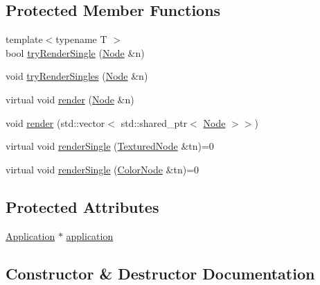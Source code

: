 \subsection*{Protected Member Functions}
\begin{DoxyCompactItemize}
\item 
{\footnotesize template$<$typename T $>$ }\\bool \mbox{\hyperlink{classsage_1_1Renderer_a2735ace3b20cd5703c54b0825ce3df85}{try\+Render\+Single}} (\mbox{\hyperlink{classsage_1_1Node}{Node}} \&n)
\item 
void \mbox{\hyperlink{classsage_1_1Renderer_a860500c3a330cee6471f384e5a8139c1}{try\+Render\+Singles}} (\mbox{\hyperlink{classsage_1_1Node}{Node}} \&n)
\item 
virtual void \mbox{\hyperlink{classsage_1_1Renderer_a213548aab22256923579dcfda01b12ba}{render}} (\mbox{\hyperlink{classsage_1_1Node}{Node}} \&n)
\item 
void \mbox{\hyperlink{classsage_1_1Renderer_a26b3671c3df207eaf2620fdc06a2610e}{render}} (std\+::vector$<$ std\+::shared\+\_\+ptr$<$ \mbox{\hyperlink{classsage_1_1Node}{Node}} $>$$>$)
\item 
virtual void \mbox{\hyperlink{classsage_1_1Renderer_aa79cfd587fa85ae8ea7ccf465825d212}{render\+Single}} (\mbox{\hyperlink{classsage_1_1TexturedNode}{Textured\+Node}} \&tn)=0
\item 
virtual void \mbox{\hyperlink{classsage_1_1Renderer_a8f0af306879420d208abd8a0555055b5}{render\+Single}} (\mbox{\hyperlink{classsage_1_1ColorNode}{Color\+Node}} \&tn)=0
\end{DoxyCompactItemize}
\subsection*{Protected Attributes}
\begin{DoxyCompactItemize}
\item 
\mbox{\hyperlink{classsage_1_1Application}{Application}} $\ast$ \mbox{\hyperlink{classsage_1_1Renderer_a76559bf364299fb39ce7d9d084d56958}{application}}
\end{DoxyCompactItemize}


\subsection{Constructor \& Destructor Documentation}
\mbox{\label{classsage_1_1Renderer_aea1ceb080017504798f28cde4d45502e}} 
